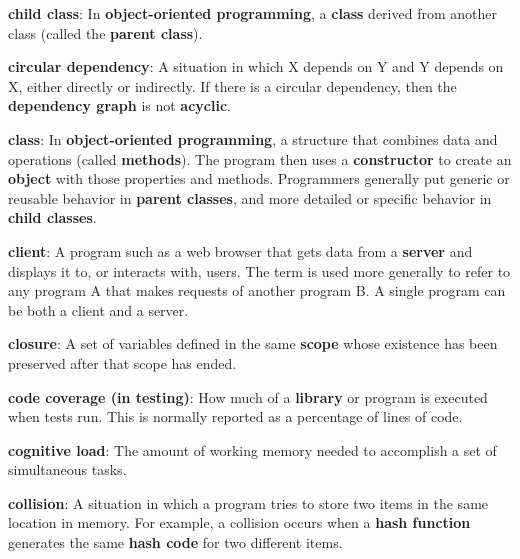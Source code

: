 \documentclass[krantzl]{krantz}
\newcommand{\glosskey}[1]{\textbf{#1}}
\begin{document}
\noindent \textbf{{\newline}\glosskey{child class}}: 
In \glosskey{object-oriented programming}, a \glosskey{class} derived from another class (called the \glosskey{parent class}).


\noindent \textbf{{\newline}\glosskey{circular dependency}}: 
A situation in which X depends on Y and Y depends on X, either directly or indirectly. If there is a circular dependency, then the \glosskey{dependency graph} is not \glosskey{acyclic}.


\noindent \textbf{{\newline}\glosskey{class}}: 
In \glosskey{object-oriented programming}, a structure that combines data and operations (called \glosskey{methods}). The program then uses a \glosskey{constructor} to create an \glosskey{object} with those properties and methods. Programmers generally put generic or reusable behavior in \glosskey{parent classes}, and more detailed or specific behavior in \glosskey{child classes}.


\noindent \textbf{{\newline}\glosskey{client}}: 
A program such as a web browser that gets data from a \glosskey{server} and displays it to, or interacts with, users. The term is used more generally to refer to any program A that makes requests of another program B. A single program can be both a client and a server.


\noindent \textbf{{\newline}\glosskey{closure}}: 
A set of variables defined in the same \glosskey{scope} whose existence has been preserved after that scope has ended.


\noindent \textbf{{\newline}\glosskey{code coverage (in testing)}}: 
How much of a \glosskey{library} or program is executed when tests run. This is normally reported as a percentage of lines of code.


\noindent \textbf{{\newline}\glosskey{cognitive load}}: 
The amount of working memory needed to accomplish a set of simultaneous tasks.


\noindent \textbf{{\newline}\glosskey{collision}}: 
A situation in which a program tries to store two items in the same location in memory. For example, a collision occurs when a \glosskey{hash function} generates the same \glosskey{hash code} for two different items.
\end{document}
